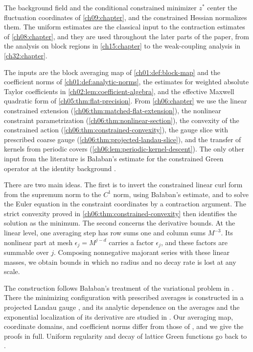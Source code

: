 The background field and the conditional constrained minimizer $z^*$ center the fluctuation coordinates of \cref{ch09:chapter}, and the constrained Hessian normalizes them. The uniform estimates are the classical input to the contraction estimates of \cref{ch08:chapter}, and they are used throughout the later parts of the paper, from the analysis on block regions in \cref{ch15:chapter} to the weak-coupling analysis in \cref{ch32:chapter}.

The inputs are the block averaging map of \cref{ch01:def:block-map} and the coefficient norms of \cref{ch01:def:analytic-norms}, the estimates for weighted absolute Taylor coefficients in \cref{ch02:lem:coefficient-algebra}, and the effective Maxwell quadratic form of \cref{ch05:thm:flat-precision}. From \cref{ch06:chapter} we use the linear constrained extension (\cref{ch06:thm:matched-flat-extension}), the nonlinear constraint parametrization (\cref{ch06:thm:nonlinear-section}), the convexity of the constrained action (\cref{ch06:thm:constrained-convexity}), the gauge slice with prescribed coarse gauge (\cref{ch06:thm:projected-landau-slice}), and the transfer of kernels from periodic covers (\cref{ch06:lem:periodic-kernel-descent}). The only other input from the literature is Ba{\l}aban's estimate for the constrained Green operator at the identity background \cite[Theorem~3.13, p.~426]{Balaban1985Background}.

There are two main ideas. The first is to invert the constrained linear curl form from the supremum norm to the $C^1$ norm, using Ba{\l}aban's estimate, and to solve the Euler equation in the constraint coordinates by a contraction argument. The strict convexity proved in \cref{ch06:thm:constrained-convexity} then identifies the solution as the minimum. The second concerns the derivative bounds. At the linear level, one averaging step has row sums one and column sums $M^{-3}$. Its nonlinear part at mesh $\epsilon_j=M^{j-d}$ carries a factor $\epsilon_j$, and these factors are summable over $j$. Composing nonnegative majorant series with these linear masses, we obtain bounds in which no radius and no decay rate is lost at any scale.

The construction follows Ba{\l}aban's treatment of the variational problem in \cite{Balaban1985Variational}. There the minimizing configuration with prescribed averages is constructed in a projected Landau gauge \cite[Theorem~1, p.~279]{Balaban1985Variational}, and its analytic dependence on the averages and the exponential localization of its derivative are studied in \cite[Section~G, pp.~305--309, and Proposition~9, p.~309]{Balaban1985Variational}. Our averaging map, coordinate domains, and coefficient norms differ from those of \cite{Balaban1985Variational}, and we give the proofs in full. Uniform regularity and decay of lattice Green functions go back to \cite{Balaban1983Green}.

